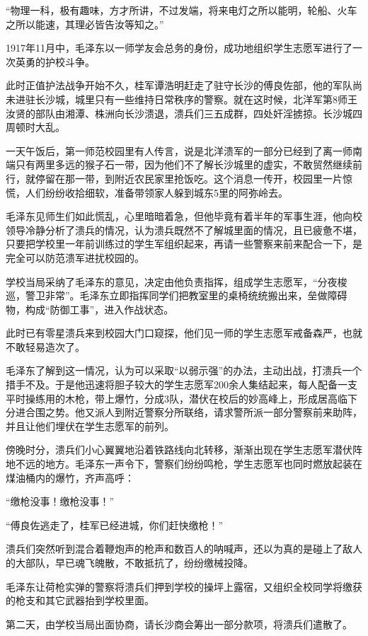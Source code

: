 \documentclass[../../dazhuan.tex]{subfiles}
\begin{document}
“物理一科，极有趣味，方才所讲，不过发端，将来电灯之所以能明，轮船、火车之所以能速，其理必皆告汝等知之。”

1917年11月中，毛泽东以一师学友会总务的身份，成功地组织学生志愿军进行了一次英勇的护校斗争。

此时正值护法战争开始不久，桂军谭浩明赶走了驻守长沙的傅良佐部，他的军队尚未进驻长沙城，城里只有一些维持日常秩序的警察。就在这时候，北洋军第8师王汝贤的部队由湘潭、株洲向长沙溃退，溃兵们三五成群，四处奸淫掳掠。长沙城四周顿时大乱。

一天午饭后，第一师范校园里有人传言，说是北洋溃军的一部分已经到了离一师南端只有两里多远的猴子石一带，因为他们不了解长沙城里的虚实，不敢贸然继续前行，就停留在那一带，到附近农民家里抢饭吃。这个消息一传开，校园里一片惊慌，人们纷纷收拾细软，准备带领家人躲到城东5里的阿弥岭去。

毛泽东见师生们如此慌乱，心里暗暗着急，但他毕竟有着半年的军事生涯，他向校领导冷静分析了溃兵的情况，认为溃兵既然不了解城里面的情况，且已疲惫不堪，只要把学校里一年前训练过的学生军组织起来，再请一些警察来前来配合一下，是完全可以防范溃军进扰校园的。

学校当局采纳了毛泽东的意见，决定由他负责指挥，组成学生志愿军，“分夜梭巡，警卫非常”。毛泽东立即指挥同学们把教室里的桌椅统统搬出来，垒做障碍物，构成“防御工事”，进入作战状态。

此时已有零星溃兵来到校园大门口窥探，他们见一师的学生志愿军戒备森严，也就不敢轻易造次了。

毛泽东了解到这一情况，认为可以采取“以弱示强”的办法，主动出战，打溃兵一个措手不及。于是他迅速将胆子较大的学生志愿军200余人集结起来，每人配备一支平时操练用的木枪，带上爆竹，分成3队，潜伏在校后的妙高峰上，形成居高临下分进合围之势。他又派人到附近警察分所联络，请求警所派一部分警察前来助阵，并且让他们埋伏在学生志愿军的前列。

傍晚时分，溃兵们小心翼翼地沿着铁路线向北转移，渐渐出现在学生志愿军潜伏阵地不远的地方。毛泽东一声令下，警察们纷纷鸣枪，学生志愿军也同时燃放起装在煤油桶内的爆竹，齐声高呼：

“缴枪没事！缴枪没事！”

“傅良佐逃走了，桂军已经进城，你们赶快缴枪！”

溃兵们突然听到混合着鞭炮声的枪声和数百人的呐喊声，还以为真的是碰上了敌人的大部队，早已魂飞魄散，不敢抵抗了，纷纷缴械投降。

毛泽东让荷枪实弹的警察将溃兵们押到学校的操坪上露宿，又组织全校同学将缴获的枪支和其它武器抬到学校里面。

第二天，由学校当局出面协商，请长沙商会筹出一部分款项，将溃兵们遣散了。
\end{document}
